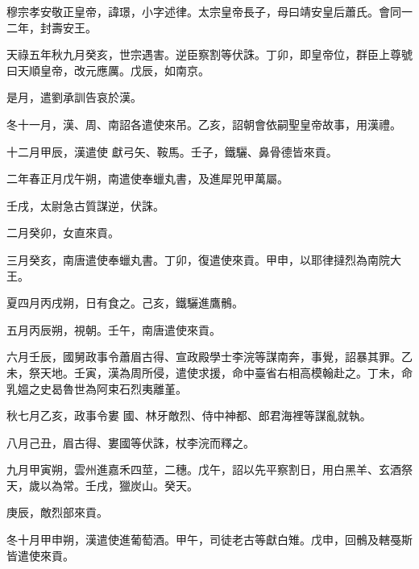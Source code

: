 
\begin{pinyinscope}

 穆宗孝安敬正皇帝，諱璟，小字述律。太宗皇帝長子，母曰靖安皇后蕭氏。會同一二年，封壽安王。



 天祿五年秋九月癸亥，世宗遇害。逆臣察割等伏誅。丁卯，即皇帝位，群臣上尊號曰天順皇帝，改元應厲。戊辰，如南京。



 是月，遣劉承訓告哀於漢。



 冬十一月，漢、周、南詔各遣使來吊。乙亥，詔朝會依嗣聖皇帝故事，用漢禮。



 十二月甲辰，漢遣使
 獻弓矢、鞍馬。壬子，鐵驪、鼻骨德皆來貢。



 二年春正月戊午朔，南遣使奉蠟丸書，及進犀兕甲萬屬。



 壬戌，太尉急古質謀逆，伏誅。



 二月癸卯，女直來貢。



 三月癸亥，南唐遣使奉蠟丸書。丁卯，復遣使來貢。甲申，以耶律撻烈為南院大王。



 夏四月丙戌朔，日有食之。己亥，鐵驪進鷹鶻。



 五月丙辰朔，視朝。壬午，南唐遣使來貢。



 六月壬辰，國舅政事令蕭眉古得、宣政殿學士李浣等謀南奔，事覺，詔暴其罪。乙未，祭天地。壬寅，漢為周所侵，遣使求援，命中臺省右相高模翰赴之。丁未，命乳媼之史曷魯世為阿束石烈夷離堇。



 秋七月乙亥，政事令婁
 國、林牙敵烈、侍中神都、郎君海裡等謀亂就執。



 八月己丑，眉古得、婁國等伏誅，杖李浣而釋之。



 九月甲寅朔，雲州進嘉禾四莖，二穗。戊午，詔以先平察割日，用白黑羊、玄酒祭天，歲以為常。壬戌，獵炭山。癸天。



 庚辰，敵烈部來貢。



 冬十月甲申朔，漢遣使進葡萄酒。甲午，司徒老古等獻白雉。戊申，回鶻及轄戞斯皆遣使來貢。




\end{pinyinscope}

